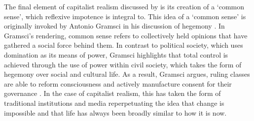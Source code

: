 The final element of capitalist realism discussed by \citet{shonkwiler_reading_2014} is its creation of a `common sense', which reflexive impotence is integral to. This idea of a `common sense' is originally invoked by Antonio Gramsci in his discussion of hegemony \citep{gramsci_selections_2007}. In Gramsci's rendering, common sense refers to collectively held opinions that have gathered a social force behind them. In contrast to political society, which uses domination as its means of power, Gramsci highlights that total control is achieved through the use of power within civil society, which takes the form of hegemony over social and cultural life. As a result, Gramsci argues, ruling classes are able to reform consciousness \citep{gramsci_selections_2007} and actively manufacture consent for their governance \citep[p. 39]{harvey_brief_2007}. In the case of capitalist realism, this has taken the form of traditional institutions and media reperpetuating the idea that change is impossible and that life has always been broadly similar to how it is now. 

